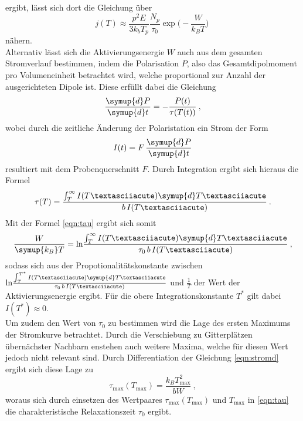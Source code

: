 ergibt, lässt sich dort die Gleichung über
\begin{equation}
  j(T)\approx \frac{p^2E}{3k_bT_p}\frac{N_p}{\tau_0} \exp{\Big(-\frac{W}{k_BT}\Big)} \:
  \label{eqn:stromnäherung}
\end{equation}
nähern. \\
Alternativ lässt sich die Aktivierungsenergie $W$ auch aus dem gesamten Stromverlauf bestimmen,
indem die Polarisation $P$, also das Gesamtdipolmoment pro Volumeneinheit betrachtet wird, welche
proportional zur Anzahl der ausgerichteten Dipole ist. Diese erfüllt dabei die Gleichung
\begin{equation}
  \frac{\symup{d}P}{\symup{d}t}=-\frac{P(t)}{\tau(T(t))} \: ,
  \label{eqn:PolDGL}
\end{equation}
wobei durch die zeitliche Änderung der Polaristation ein Strom der Form
\begin{equation}
  I(t)=F\, \frac{\symup{d}P}{\symup{d}t}
\end{equation}
resultiert mit dem Probenquerschnitt $F$. Durch Integration ergibt sich hieraus die Formel
\begin{equation}
  \tau(T)=\frac{\int_T^\infty I(T´)\symup{d}T´}{b\,I(T´)} \: .
\end{equation}
Mit der Formel \eqref{eqn:tau} ergibt sich somit
\begin{equation}
  \frac{W}{\symup{k_B}T}=\text{ln}\frac{\int_T^\infty I(T´)\symup{d}T´}{\tau_0\,b\,I(T´)} \: ,
\end{equation}
sodass sich aus der Propotionalitätskonstante zwischen $\text{ln}\frac{\int_T^{T^*} I(T´)\symup{d}T´}{\tau_0\,b\,I(T´)}$
und $\frac{1}{T}$ der Wert der Aktivierungsenergie ergibt. Für die obere Integrationskonstante $T^*$
gilt dabei $I(T^*)\approx0$. \\
Um zudem den Wert von $\tau_0$ zu bestimmen wird die Lage des ersten Maximums der Stromkurve betrachtet.
Durch die Verschiebung zu Gitterplätzen übernächster Nachbarn enstehen auch weitere Maxima,
welche für diesen Wert jedoch nicht relevant sind. Durch Differentiation der
Gleichung \eqref{eqn:stromd} ergibt sich diese Lage
zu
\begin{equation}
  \tau_{\text{max}}(T_{\text{max}})=\frac{k_BT^2_{\text{max}}}{bW} \: ,
\end{equation}
woraus sich durch einsetzen des Wertpaares $\tau_{\text{max}}(T_{\text{max}})$ und
$T_{\text{max}}$ in \eqref{eqn:tau} die charakteristische Relaxationszeit $\tau_0$ ergibt.
